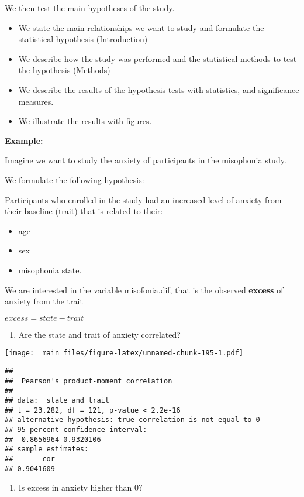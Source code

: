 \documentclass[
]{book}
\providecommand{\tightlist}{%
  \setlength{\itemsep}{0pt}\setlength{\parskip}{0pt}}
\begin{document}
We then test the main hypotheses of the study.

\begin{itemize}
\item
  We state the main relationships we want to study and formulate the statistical hypothesis (Introduction)
\item
  We describe how the study was performed and the statistical methods to test the hypothesis (Methods)
\item
  We describe the results of the hypothesis tests with statistics, and significance measures.
\item
  We illustrate the results with figures.
\end{itemize}

\textbf{Example:}

Imagine we want to study the anxiety of participants in the misophonia study.

We formulate the following hypothesis:

Participants who enrolled in the study had an increased level of anxiety from their baseline (trait) that is related to their:

\begin{itemize}
\tightlist
\item
  age
\item
  sex
\item
  misophonia state.
\end{itemize}

We are interested in the variable misofonia.dif, that is the observed \textbf{excess} of anxiety from the trait

\(excess = state - trait\)

\begin{enumerate}
\def\labelenumi{\arabic{enumi}.}
\tightlist
\item
  Are the state and trait of anxiety correlated?
\end{enumerate}

\texttt{[image: \_main\_files/figure-latex/unnamed-chunk-195-1.pdf]}

\begin{verbatim}
## 
##  Pearson's product-moment correlation
## 
## data:  state and trait
## t = 23.282, df = 121, p-value < 2.2e-16
## alternative hypothesis: true correlation is not equal to 0
## 95 percent confidence interval:
##  0.8656964 0.9320106
## sample estimates:
##       cor 
## 0.9041609
\end{verbatim}

\begin{enumerate}
\def\labelenumi{\arabic{enumi}.}
\setcounter{enumi}{1}
\tightlist
\item
  Is excess in anxiety higher than \(0\)?
\end{enumerate}
\end{document}
